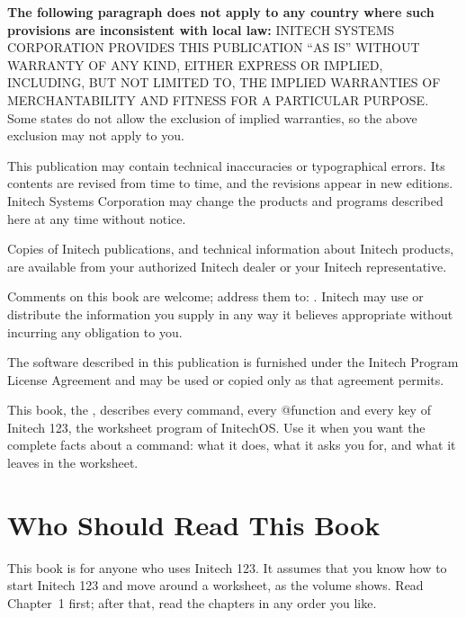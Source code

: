 \begin{TitleVerso}
\IsThisGoodForTheCompany\par
{\imLegalFont
\textbf{The following paragraph does not apply to any country where such
provisions are inconsistent with local law:} INITECH SYSTEMS CORPORATION
PROVIDES THIS PUBLICATION ``AS IS'' WITHOUT WARRANTY OF ANY KIND, EITHER
EXPRESS OR IMPLIED, INCLUDING, BUT NOT LIMITED TO, THE IMPLIED WARRANTIES OF
MERCHANTABILITY AND FITNESS FOR A PARTICULAR PURPOSE.  Some states do not
allow the exclusion of implied warranties, so the above exclusion may not
apply to you.\par
This publication may contain technical inaccuracies or typographical errors.
Its contents are revised from time to time, and the revisions appear in new
editions.  Initech Systems Corporation may change the products and programs
described here at any time without notice.\par
Copies of Initech publications, and technical information about Initech
products, are available from your authorized Initech dealer or your Initech
representative.\par}

{\footnotesize
Comments on this book are welcome; address them to: \InitechAddressLine.
Initech may use or distribute the information you supply in any way it
believes appropriate without incurring any obligation to you.\par
The software described in this publication is furnished under the Initech
Program License Agreement and may be used or copied only as that agreement
permits.\par}
\end{TitleVerso}

This book, the , describes every command,
every @function and every key of Initech 123, the worksheet program of
InitechOS.  Use it when you want the complete facts about a command: what
it does, what it asks you for, and what it leaves in the worksheet.

\section{Who Should Read This Book}
This book is for anyone who uses Initech 123.  It assumes that you know how
to start Initech 123 and move around a worksheet, as the
 volume shows.  Read Chapter~1 first; after that, read the
chapters in any order you like.

